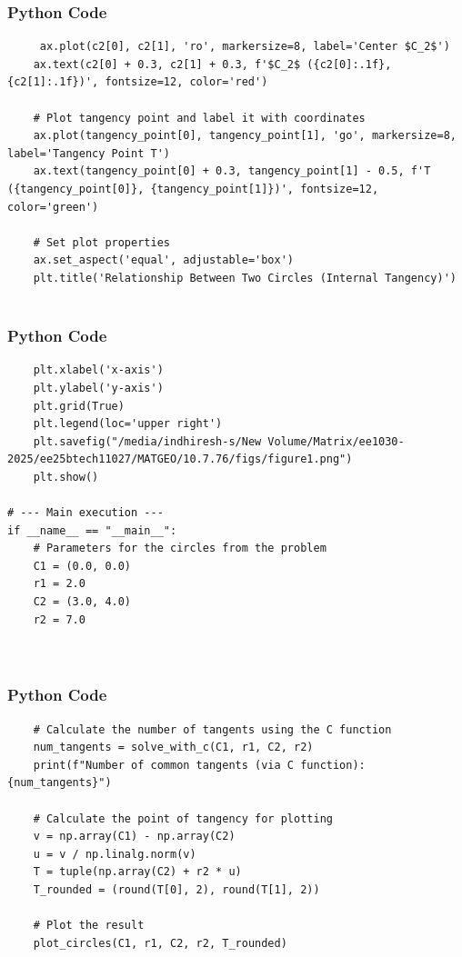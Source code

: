\documentclass{beamer}
\begin{document}
    \begin{frame}[fragile]
        \frametitle{Python Code}
        \begin{lstlisting}
     ax.plot(c2[0], c2[1], 'ro', markersize=8, label='Center $C_2$')
    ax.text(c2[0] + 0.3, c2[1] + 0.3, f'$C_2$ ({c2[0]:.1f}, {c2[1]:.1f})', fontsize=12, color='red')

    # Plot tangency point and label it with coordinates
    ax.plot(tangency_point[0], tangency_point[1], 'go', markersize=8, label='Tangency Point T')
    ax.text(tangency_point[0] + 0.3, tangency_point[1] - 0.5, f'T ({tangency_point[0]}, {tangency_point[1]})', fontsize=12, color='green')

    # Set plot properties
    ax.set_aspect('equal', adjustable='box')
    plt.title('Relationship Between Two Circles (Internal Tangency)')
    

        \end{lstlisting}
    \end{frame}

    \begin{frame}[fragile]
        \frametitle{Python Code}
        \begin{lstlisting}
    plt.xlabel('x-axis')
    plt.ylabel('y-axis')
    plt.grid(True)
    plt.legend(loc='upper right')
    plt.savefig("/media/indhiresh-s/New Volume/Matrix/ee1030-2025/ee25btech11027/MATGEO/10.7.76/figs/figure1.png")
    plt.show()

# --- Main execution ---
if __name__ == "__main__":
    # Parameters for the circles from the problem
    C1 = (0.0, 0.0)
    r1 = 2.0
    C2 = (3.0, 4.0)
    r2 = 7.0

   
        \end{lstlisting}
    \end{frame}

     \begin{frame}[fragile]
        \frametitle{Python Code}
        \begin{lstlisting}
    # Calculate the number of tangents using the C function
    num_tangents = solve_with_c(C1, r1, C2, r2)
    print(f"Number of common tangents (via C function): {num_tangents}")

    # Calculate the point of tangency for plotting
    v = np.array(C1) - np.array(C2)
    u = v / np.linalg.norm(v)
    T = tuple(np.array(C2) + r2 * u)
    T_rounded = (round(T[0], 2), round(T[1], 2))

    # Plot the result
    plot_circles(C1, r1, C2, r2, T_rounded)
        \end{lstlisting}
    \end{frame}
    
\end{document}
